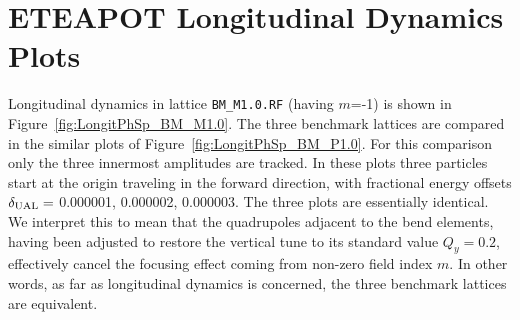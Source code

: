 \documentclass[]{article}
\begin{document}
\section{ETEAPOT Longitudinal Dynamics Plots}
Longitudinal dynamics in lattice {\tt BM\_M1.0.RF} (having $m$=-1) is
shown in Figure~\ref{fig:LongitPhSp_BM_M1.0}.
The three
benchmark lattices are compared in the similar plots of
Figure~\ref{fig:LongitPhSp_BM_P1.0}. For this comparison 
only the three innermost amplitudes
are tracked. In these plots three particles start at the origin
traveling in the forward direction, with fractional
energy offsets $\delta_{\rm UAL}=$ 0.000001, 0.000002, 0.000003.
The three plots are essentially identical. We interpret this
to mean that the quadrupoles adjacent to the bend elements,
having been adjusted to restore the vertical tune to its
standard value $Q_y=0.2$, effectively cancel the
focusing effect coming from non-zero field index $m$.
In other words, as far as longitudinal dynamics is concerned,
the three benchmark lattices are equivalent.
\end{document}
